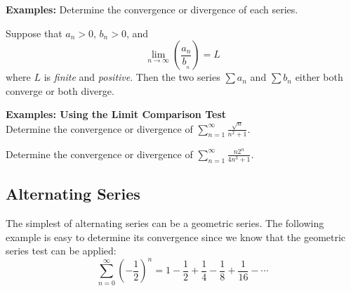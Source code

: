 \documentclass[addpoints, 12pt]{exam}
\begin{document}
\noindent\textbf{Examples:} Determine the convergence or divergence of each series.

\newpage

\begin{tcolorbox}[title= THE LIMIT COMPARISON TEST,colframe=black,sharp corners,colback=white,colbacktitle=white,coltitle=black]

    Suppose that $a_n>0,\,b_n>0$, and
    \[\lim_{n\to\infty}\left(\frac{a_n}{b__n}\right)=L\]
    where $L$ is \textit{finite} and \textit{positive}. Then the two series $\displaystyle\sum a_n$ and $\displaystyle\sum b_n$ either both converge or both diverge.

\end{tcolorbox}
\vspace{.1in}
\noindent\textbf{Examples: Using the Limit Comparison Test}\\
Determine the convergence or divergence of $\displaystyle\sum_{n=1}^{\infty}\frac{\sqrt{n}}{n^2+1}$.


Determine the convergence or divergence of $\displaystyle\sum_{n=1}^\infty\frac{n2^n}{4n^3+1}$.




\newpage
{}
\subsection*{Alternating Series}
The simplest of alternating series can be a geometric series. The following example is easy to determine its convergence since we know that the geometric series test can be applied:
\[\sum_{n=0}^{\infty}\left(-\frac{1}{2}\right)^n=1-\frac{1}{2}+\frac{1}{4}-\frac{1}{8}+\frac{1}{16}-\cdots\]
\end{document}
